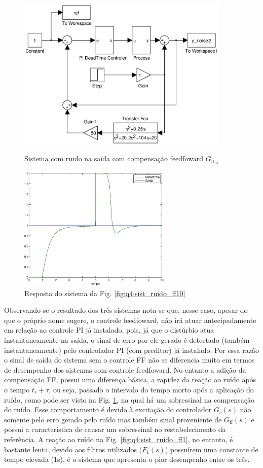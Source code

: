 \begin{figure}[htb]
\centering
\includegraphics[width=0.9\textwidth]{imgs/questao4/sist_ruido_ff2}
\caption{Sistema com ruido na saída com compensação feedfoward $G_{\text{ff}_{10}}$}
\label{fig:q4:sist_ruido_ff10}
\includegraphics[width=0.65\textwidth]{imgs/questao4/saida_ruido_ff2}
\caption{Resposta do sistema da Fig. \ref{fig:q4:sist_ruido_ff10}}
\label{fig:q4:saida_ruido_ff10}
\end{figure}

Observando-se o resultado dos três sistemas nota-se que, nesse caso, apesar do
que o próprio nome sugere, o controle feedfoward, não irá atuar antecipadamente
em relação ao controle PI já instalado, pois, já que o distúrbio atua
instantaneamente na saída, o sinal de erro por ele gerado é detectado (também
instantaneamente) pelo controlador PI (com preditor) já instalado. Por essa
razão o sinal de saída do sistema sem o controle FF não se diferencia muito em
termos de desempenho dos sistemas com controle feedfoward. No entanto a adição
da compensação FF, possui uma diferença básica, a rapidez da reação ao ruído
após o tempo $t_r + \tau$, ou seja, passado o intervalo do tempo morto após a
aplicação do ruído, como pode ser visto na Fig. \ref{fig:q4:saida_ruido_ff10},
na qual há um sobressinal na compensação do ruído. Esse comportamento é devido à
excitação do controlador $G_c(s)$ não somente pelo erro gerado pelo ruído mas
também sinal proveniente de $G_\text{ff}(s)$ e possui a característica de causar um
sobressinal no restabelecimento da referência. A reação ao ruído na Fig.
\ref{fig:q4:sist_ruido_ff1}, no entanto, é bastante lenta, devido aos filtros utilizados
($F_1(s)$) possuírem uma constante de tempo elevada ($1$s), é o sistema que
apresenta o pior desempenho entre os três.
